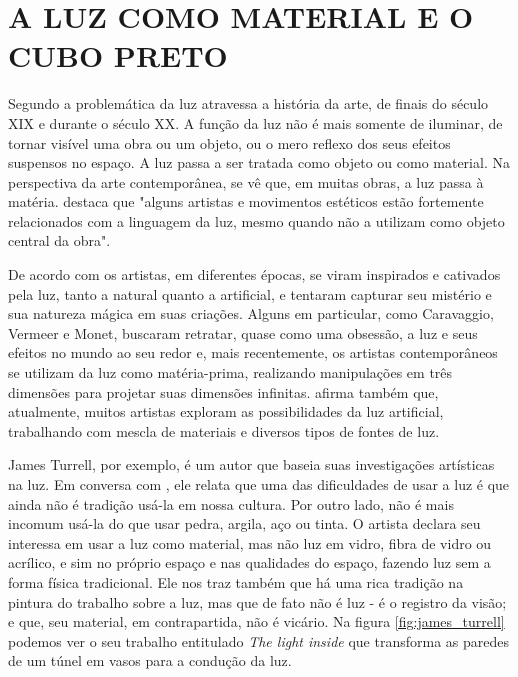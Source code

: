 \chapter{A LUZ COMO MATERIAL E O CUBO PRETO}

Segundo  a problemática da luz atravessa a história da arte, de finais do século XIX e durante o século XX. A função da luz não é mais somente de iluminar, de tornar visível uma obra ou um objeto, ou o mero reflexo dos seus efeitos suspensos no espaço. A luz passa a ser tratada como objeto ou como material. Na perspectiva da arte contemporânea, se vê que, em muitas obras, a luz passa à matéria.  destaca que "alguns artistas e movimentos estéticos estão fortemente relacionados com a linguagem da luz, mesmo quando não a utilizam como objeto central da obra". 

De acordo com  os artistas, em diferentes épocas, se viram inspirados e cativados pela luz, tanto a natural quanto a artificial, e tentaram capturar seu mistério e sua natureza mágica em suas criações. Alguns em particular, como Caravaggio, Vermeer e Monet, buscaram retratar, quase como uma obsessão, a luz e seus efeitos no mundo ao seu redor e, mais recentemente, os artistas contemporâneos se utilizam da luz como matéria-prima, realizando manipulações em três dimensões para projetar suas dimensões infinitas.  afirma também que, atualmente, muitos artistas exploram as possibilidades da luz artificial, trabalhando com mescla de materiais e diversos tipos de fontes de luz. 

James Turrell, por exemplo, é um autor que baseia suas investigações artísticas na luz. Em conversa com , ele relata que uma das dificuldades de usar a luz é que ainda não é tradição usá-la em nossa cultura. Por outro lado, não é mais incomum usá-la do que usar pedra, argila, aço ou tinta. O artista declara seu interessa em usar a luz como material, mas não luz em vidro, fibra de vidro ou acrílico, e sim no próprio espaço e nas qualidades do espaço, fazendo luz sem a forma física tradicional. Ele nos traz também que há uma rica tradição na pintura do trabalho sobre a luz, mas que de fato não é luz - é o registro da visão; e que, seu material, em contrapartida, não é vicário. Na figura \ref{fig:james_turrell} podemos ver o seu trabalho entitulado \textit{The light inside} que transforma as paredes de um túnel em vasos para a condução da luz. 

